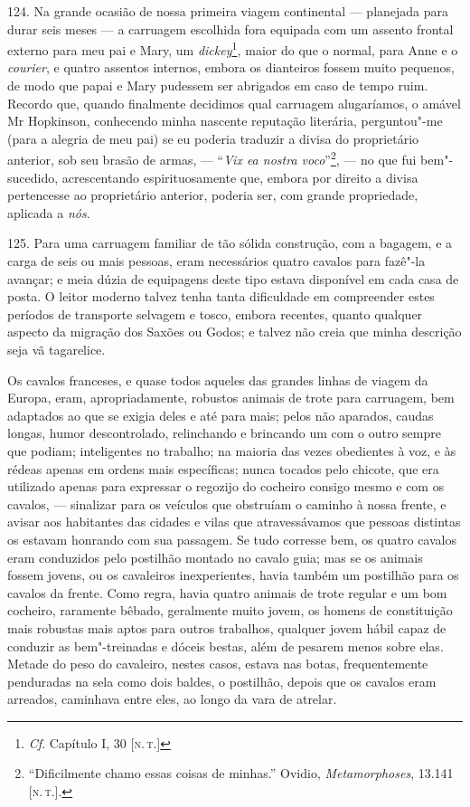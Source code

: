 124. Na grande ocasião de nossa primeira viagem continental --- planejada
para durar seis meses --- a carruagem escolhida fora equipada com um
assento frontal externo para meu pai e Mary, um \emph{dickey}\footnote{\emph{Cf}.
  Capítulo I, 30 {[}\textsc{n.\,t.}{]}}\emph{,} maior do que o normal, para
Anne e o \emph{courier}, e quatro assentos internos, embora os
dianteiros fossem muito pequenos, de modo que papai e Mary pudessem ser
abrigados em caso de tempo ruim. Recordo que, quando finalmente
decidimos qual carruagem alugaríamos, o amável Mr Hopkinson, conhecendo
minha nascente reputação literária, perguntou"-me (para a alegria de meu
pai) se eu poderia traduzir a divisa do proprietário anterior, sob seu
brasão de armas, --- ``\emph{Vix ea nostra voco}''\footnote{``Dificilmente
  chamo essas coisas de minhas.'' Ovidio, \emph{Metamorphoses}, 13.141
  {[}\textsc{n.\,t.}{]}.}, --- no que fui bem"-sucedido, acrescentando
espirituosamente que, embora por direito a divisa pertencesse ao
proprietário anterior, poderia ser, com grande propriedade, aplicada a
\emph{nós}.

125. Para uma carruagem familiar de tão sólida construção, com a
bagagem, e a carga de seis ou mais pessoas, eram necessários quatro
cavalos para fazê"-la avançar; e meia dúzia de equipagens deste tipo
estava disponível em cada casa de posta. O leitor moderno talvez tenha
tanta dificuldade em compreender estes períodos de transporte selvagem e
tosco, embora recentes, quanto qualquer aspecto da migração dos Saxões
ou Godos; e talvez não creia que minha descrição seja vã tagarelice.

Os cavalos franceses, e quase todos aqueles das grandes linhas de viagem
da Europa, eram, apropriadamente, robustos animais de trote para
carruagem, bem adaptados ao que se exigia deles e até para mais; pelos
não aparados, caudas longas, humor descontrolado, relinchando e
brincando um com o outro sempre que podiam; inteligentes no trabalho; na
maioria das vezes obedientes à voz, e às rédeas apenas em ordens mais
específicas; nunca tocados pelo chicote, que era utilizado apenas para
expressar o regozijo do cocheiro consigo mesmo e com os cavalos, ---
sinalizar para os veículos que obstruíam o caminho à nossa frente, e
avisar aos habitantes das cidades e vilas que atravessávamos que pessoas
distintas os estavam honrando com sua passagem. Se tudo corresse bem, os
quatro cavalos eram conduzidos pelo postilhão montado no cavalo guia;
mas se os animais fossem jovens, ou os cavaleiros inexperientes, havia
também um postilhão para os cavalos da frente. Como regra, havia quatro
animais de trote regular e um bom cocheiro, raramente bêbado, geralmente
muito jovem, os homens de constituição mais robustas mais aptos para
outros trabalhos, qualquer jovem hábil capaz de conduzir as
bem"-treinadas e dóceis bestas, além de pesarem menos sobre elas. Metade
do peso do cavaleiro, nestes casos, estava nas botas, frequentemente
penduradas na sela como dois baldes, o postilhão, depois que os cavalos
eram arreados, caminhava entre eles, ao longo da vara de atrelar.

